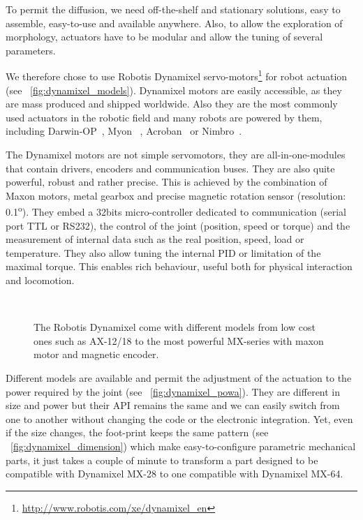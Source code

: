 
To permit the diffusion, we need off-the-shelf and stationary solutions, easy to assemble, easy-to-use and available anywhere. Also, to allow the exploration of morphology, actuators have to be modular and allow the tuning of several parameters.

We therefore chose to use Robotis Dynamixel servo-motors\footnote{\url{http://www.robotis.com/xe/dynamixel_en}} for robot actuation (see \figurename~\ref{fig:dynamixel_models}). Dynamixel motors are easily accessible, as they are mass produced and shipped worldwide. Also they are the most commonly used actuators in the robotic field and many robots are powered by them, including Darwin-OP~\parencite{REF}, Myon~\parencite{REF} , Acroban~\parencite{REF} or Nimbro~\parencite{REF}.

The Dynamixel motors are not simple servomotors, they are all-in-one-modules that contain drivers, encoders and communication buses. They are also quite powerful, robust and rather precise. This is achieved by the combination of Maxon motors, metal gearbox and precise magnetic rotation sensor (resolution: 0.1\textsuperscript{o}). They embed a 32bits micro-controller dedicated to communication (serial port TTL or RS232), the control of the joint (position, speed or torque) and the measurement of internal data such as the real position, speed, load or temperature. They also allow tuning the internal PID or limitation of the maximal torque. This enables rich behaviour, useful both for physical interaction and locomotion.


\begin{figure}[tb]
\centering
    \hfil
    \\
    \caption{The Robotis Dynamixel come with different models from low cost ones such as AX-12/18 to the most powerful MX-series with maxon motor and magnetic encoder.}
    \label{fig:dynamixel_serie}
\end{figure}

Different models are available and permit the adjustment of the actuation to the power required by the joint (see \figurename~\ref{fig:dynamixel_powa}). They are different in size and power but their API remains the same and we can easily switch from one to another without changing the code or the electronic integration. Yet, even if the size changes, the foot-print keeps the same pattern (see \figurename~\ref{fig:dynamixel_dimension}) which make easy-to-configure parametric mechanical parts, it just takes a couple of minute to transform a part designed to be compatible with Dynamixel MX-28 to one compatible with Dynamixel MX-64.


